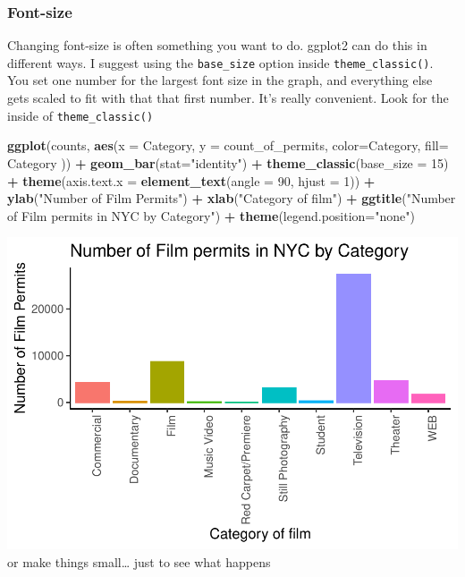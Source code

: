 \documentclass[]{book}
\newenvironment{Shaded}{\begin{snugshade}}{\end{snugshade}}
\newcommand{\KeywordTok}[1]{\textcolor[rgb]{0.13,0.29,0.53}{\textbf{#1}}}
\newcommand{\DataTypeTok}[1]{\textcolor[rgb]{0.13,0.29,0.53}{#1}}
\newcommand{\DecValTok}[1]{\textcolor[rgb]{0.00,0.00,0.81}{#1}}
\newcommand{\StringTok}[1]{\textcolor[rgb]{0.31,0.60,0.02}{#1}}
\newcommand{\OperatorTok}[1]{\textcolor[rgb]{0.81,0.36,0.00}{\textbf{#1}}}
\newcommand{\NormalTok}[1]{#1}
\begin{document}
\subsubsection{Font-size}\label{font-size}

Changing font-size is often something you want to do. ggplot2 can do
this in different ways. I suggest using the \texttt{base\_size} option
inside \texttt{theme\_classic()}. You set one number for the largest
font size in the graph, and everything else gets scaled to fit with that
that first number. It's really convenient. Look for the inside of
\texttt{theme\_classic()}

\begin{Shaded}
\begin{Highlighting}[]
\KeywordTok{ggplot}\NormalTok{(counts, }\KeywordTok{aes}\NormalTok{(}\DataTypeTok{x =}\NormalTok{ Category, }\DataTypeTok{y =}\NormalTok{ count_of_permits, }
                   \DataTypeTok{color=}\NormalTok{Category, }
                   \DataTypeTok{fill=}\NormalTok{ Category )) }\OperatorTok{+}
\StringTok{  }\KeywordTok{geom_bar}\NormalTok{(}\DataTypeTok{stat=}\StringTok{"identity"}\NormalTok{) }\OperatorTok{+}\StringTok{ }
\StringTok{  }\KeywordTok{theme_classic}\NormalTok{(}\DataTypeTok{base_size =} \DecValTok{15}\NormalTok{) }\OperatorTok{+}
\StringTok{  }\KeywordTok{theme}\NormalTok{(}\DataTypeTok{axis.text.x =} \KeywordTok{element_text}\NormalTok{(}\DataTypeTok{angle =} \DecValTok{90}\NormalTok{, }\DataTypeTok{hjust =} \DecValTok{1}\NormalTok{)) }\OperatorTok{+}
\StringTok{  }\KeywordTok{ylab}\NormalTok{(}\StringTok{"Number of Film Permits"}\NormalTok{) }\OperatorTok{+}\StringTok{ }
\StringTok{  }\KeywordTok{xlab}\NormalTok{(}\StringTok{"Category of film"}\NormalTok{) }\OperatorTok{+}
\StringTok{  }\KeywordTok{ggtitle}\NormalTok{(}\StringTok{"Number of Film permits in NYC by Category"}\NormalTok{) }\OperatorTok{+}
\StringTok{  }\KeywordTok{theme}\NormalTok{(}\DataTypeTok{legend.position=}\StringTok{"none"}\NormalTok{) }
\end{Highlighting}
\end{Shaded}

\includegraphics{Statistics_Lab_files/figure-latex/1categoryK-1.pdf} or
make things small\ldots{} just to see what happens
\end{document}
